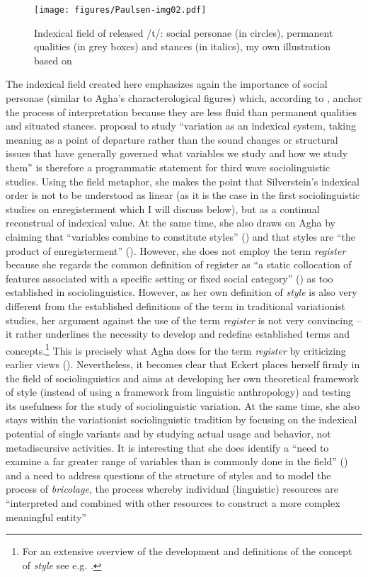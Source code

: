 \begin{figure}
\texttt{[image: figures/Paulsen-img02.pdf]}
\caption{Indexical field of released /t/: social personae (in circles), permanent qualities (in grey boxes) and stances (in italics), my own illustration based on \citet[469]{Eckert2008}}
\label{fig:2:2}
\end{figure}


The indexical field created here emphasizes again the importance of social personae (similar to Agha’s characterological figures) which, according to \citet[470]{Eckert2008}, anchor the process of interpretation because they are less fluid than permanent qualities and situated stances.  proposal to study “variation as an indexical system, taking meaning as a point of departure rather than the sound changes or structural issues that have generally governed what variables we study and how we study them” is therefore a programmatic statement for third wave sociolinguistic studies. Using the field metaphor, she makes the point that Silverstein’s indexical order is not to be understood as linear (as it is the case in the first sociolinguistic studies on enregisterment which I will discuss below), but as a continual reconstrual of indexical value. At the same time, she also draws on Agha by claiming that “variables combine to constitute styles” (\citeyear[472]{Eckert2008}) and that styles are “the product of enregisterment” (\citeyear[456]{Eckert2008}). However, she does not employ the term \textit{register} because she regards the common definition of register as “a static collocation of features associated with a specific setting or fixed social category” (\citeyear[456]{Eckert2008}) as too established in sociolinguistics. However, as her own definition of \textit{style} is also very different from the established definitions of the term in traditional variationist studies, her argument against the use of the term \textit{register} is not very convincing – it rather underlines the necessity to develop and redefine established terms and concepts.\footnote{For an extensive overview of the development and definitions of the concept of \textit{style} see e.g. \citet{Coupland2007}.} This is precisely what Agha does for the term \textit{register} by criticizing earlier views (\citeyear[167--170]{Agha2007}). Nevertheless, it becomes clear that Eckert places herself firmly in the field of sociolinguistics and aims at developing her own theoretical framework of style (instead of using a framework from linguistic anthropology) and testing its usefulness for the study of sociolinguistic variation. At the same time, she also stays within the variationist sociolinguistic tradition by focusing on the indexical potential of single variants and by studying actual usage and behavior, not metadiscursive activities. It is interesting that she does identify a “need to examine a far greater range of variables than is commonly done in the field” (\citeyear[472]{Eckert2008}) and a need to address questions of the structure of styles and to model the process of \emph{bricolage}, the process whereby individual (linguistic) resources are “interpreted and combined with other resources to construct a more complex meaningful entity” 